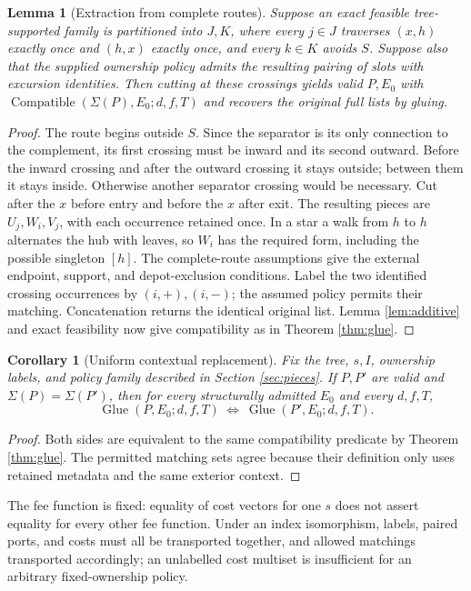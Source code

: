 \documentclass[11pt]{article}
\newtheorem{lemma}[definition]{Lemma}
\newtheorem{corollary}[definition]{Corollary}
\theoremstyle{remark}
\newcommand{\Compat}{\operatorname{Compatible}}
\newcommand{\Glue}{\operatorname{Glue}}
\begin{document}
\begin{lemma}[Extraction from complete routes]\label{lem:extract}
Suppose an exact feasible tree-supported family is partitioned into $J,K$,
where every $j\in J$ traverses $(x,h)$ exactly once and $(h,x)$ exactly once,
and every $k\in K$ avoids $S$. Suppose also that the supplied ownership
policy admits the resulting pairing of slots with excursion identities.
Then cutting at these crossings yields valid $P,E_0$ with
$\Compat(\Sigma(P),E_0;d,f,T)$ and recovers the original full lists by gluing.
\end{lemma}
\begin{proof}
The route begins outside $S$. Since the separator is its only connection to
the complement, its first crossing must be inward and its second outward.
Before the inward crossing and after the outward crossing it stays outside;
between them it stays inside. Otherwise another separator crossing would
be necessary. Cut after the $x$ before entry and before the $x$ after exit.
The resulting pieces are $U_j,W_i,V_j$, with each occurrence retained once.
In a star a walk from $h$ to $h$ alternates the hub with leaves, so $W_i$
has the required form, including the possible singleton $[h]$.
The complete-route assumptions give the external endpoint, support, and
depot-exclusion conditions. Label the two identified crossing occurrences
by $(i,+),(i,-)$; the assumed policy permits their matching.
Concatenation returns the identical original list. Lemma \ref{lem:additive}
and exact feasibility now give compatibility as in Theorem \ref{thm:glue}.
\end{proof}

\begin{corollary}[Uniform contextual replacement]\label{cor:replace}
Fix the tree, $s,I$, ownership labels, and policy family described in
Section \ref{sec:pieces}. If $P,P'$ are valid and $\Sigma(P)=\Sigma(P')$, then
for every structurally admitted $E_0$ and every $d,f,T$,
\[
 \Glue(P,E_0;d,f,T)\ \Longleftrightarrow\ \Glue(P',E_0;d,f,T).
\]
\end{corollary}
\begin{proof}
Both sides are equivalent to the same compatibility predicate by
Theorem \ref{thm:glue}. The permitted matching sets agree because their
definition only uses retained metadata and the same exterior context.
\end{proof}
The fee function is fixed: equality of cost vectors for one $s$ does not
assert equality for every other fee function. Under an index isomorphism,
labels, paired ports, and costs must all be transported together, and allowed
matchings transported accordingly; an unlabelled cost multiset is insufficient
for an arbitrary fixed-ownership policy.
\end{document}
